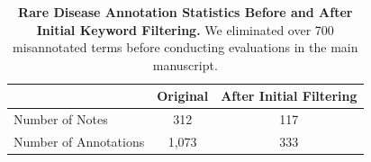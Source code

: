 \begin{table}[h]
\centering
\begin{tabular}{l c c}
\hline
\textbf{} & \textbf{Original} & \textbf{After Initial Filtering} \\
\hline
Number of Notes & 312 & 117 \\
Number of Annotations & 1,073 & 333 \\
\hline
\end{tabular}
\caption{\textbf{Rare Disease Annotation Statistics Before and After Initial Keyword Filtering.} We eliminated over 700 misannotated terms before conducting evaluations in the main manuscript.}
\label{tab:filtering_results_ex}
\end{table}
\clearpage


